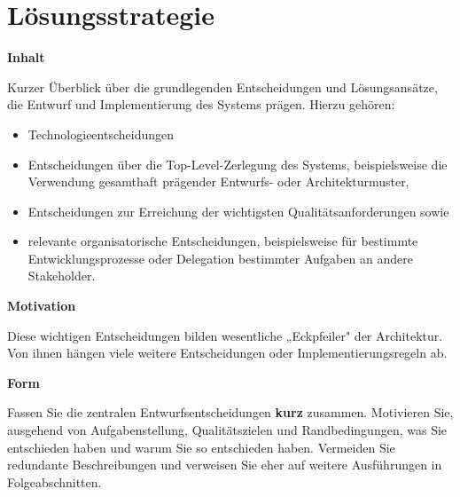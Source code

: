 \hypertarget{luxf6sungsstrategie}{%
\section{Lösungsstrategie}\label{luxf6sungsstrategie}}

\textbf{Inhalt}

Kurzer Überblick über die grundlegenden Entscheidungen und
Lösungsansätze, die Entwurf und Implementierung des Systems prägen.
Hierzu gehören:

\begin{itemize}
\item
  Technologieentscheidungen
\item
  Entscheidungen über die Top-Level-Zerlegung des Systems,
  beispielsweise die Verwendung gesamthaft prägender Entwurfs- oder
  Architekturmuster,
\item
  Entscheidungen zur Erreichung der wichtigsten Qualitätsanforderungen
  sowie
\item
  relevante organisatorische Entscheidungen, beispielsweise für
  bestimmte Entwicklungsprozesse oder Delegation bestimmter Aufgaben an
  andere Stakeholder.
\end{itemize}

\textbf{Motivation}

Diese wichtigen Entscheidungen bilden wesentliche „Eckpfeiler" der
Architektur. Von ihnen hängen viele weitere Entscheidungen oder
Implementierungsregeln ab.

\textbf{Form}

Fassen Sie die zentralen Entwurfsentscheidungen \textbf{kurz} zusammen.
Motivieren Sie, ausgehend von Aufgabenstellung, Qualitätszielen und
Randbedingungen, was Sie entschieden haben und warum Sie so entschieden
haben. Vermeiden Sie redundante Beschreibungen und verweisen Sie eher
auf weitere Ausführungen in Folgeabschnitten.
